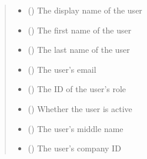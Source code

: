 \documentclass[letterpaper,10pt,english]{sphinxmanual}
\begin{document}
\begin{fulllineitems}
\begin{fulllineitems}
\begin{quote}
\begin{description}
\begin{itemize}
\item {} 
\sphinxAtStartPar
{} () \textendash{} The display name of the user

\item {} 
\sphinxAtStartPar
{} () \textendash{} The first name of the user

\item {} 
\sphinxAtStartPar
{} () \textendash{} The last name of the user

\item {} 
\sphinxAtStartPar
{} () \textendash{} The user’s email

\item {} 
\sphinxAtStartPar
{} () \textendash{} The ID of the user’s role

\item {} 
\sphinxAtStartPar
{} (\sphinxstyleliteralemphasis{\sphinxupquote{ (}}\sphinxstyleliteralemphasis{\sphinxupquote{)}}) \textendash{} Whether the user is active

\item {} 
\sphinxAtStartPar
{} (\sphinxstyleliteralemphasis{\sphinxupquote{ (}}\sphinxstyleliteralemphasis{\sphinxupquote{)}}) \textendash{} The user’s middle name

\item {} 
\sphinxAtStartPar
{} (\sphinxstyleliteralemphasis{\sphinxupquote{ (}}\sphinxstyleliteralemphasis{\sphinxupquote{)}}) \textendash{} The user’s company ID


\end{itemize}
\end{description}
\end{quote}
\end{fulllineitems}
\end{fulllineitems}
\end{document}

